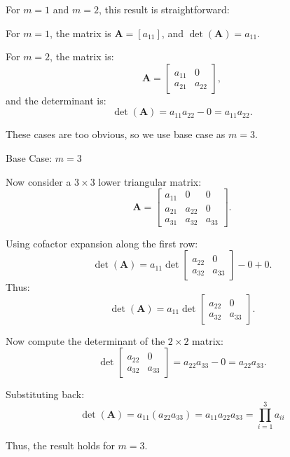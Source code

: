 \documentclass[12pt]{article}
\begin{document}
    For \( m = 1 \) and \( m = 2 \), this result is straightforward:
    
    For \( m = 1 \), the matrix is \( \mathbf{A} = [a_{11}] \), and \( \det(\mathbf{A}) = a_{11} \).
    
    For \( m = 2 \), the matrix is:
    \[
    \mathbf{A} = 
    \begin{bmatrix}
    a_{11} & 0 \\
    a_{21} & a_{22}
    \end{bmatrix},
    \]
    and the determinant is:
    \[
    \det(\mathbf{A}) = a_{11} a_{22} - 0 = a_{11} a_{22}.
    \]
        
    These cases are too obvious, so we use base case as $m=3$.
    \vspace{\baselineskip}

    Base Case: \( m = 3 \)
    
    Now consider a \( 3 \times 3 \) lower triangular matrix:
    \[
    \mathbf{A} = 
    \begin{bmatrix}
    a_{11} & 0 & 0 \\
    a_{21} & a_{22} & 0 \\
    a_{31} & a_{32} & a_{33}
    \end{bmatrix}.
    \]
    
    Using cofactor expansion along the first row:
    \[
    \det(\mathbf{A}) = a_{11} \det
    \begin{bmatrix}
    a_{22} & 0 \\
    a_{32} & a_{33}
    \end{bmatrix} - 0 + 0.
    \]
    Thus:
    \[
    \det(\mathbf{A}) = a_{11} \det
    \begin{bmatrix}
    a_{22} & 0 \\
    a_{32} & a_{33}
    \end{bmatrix}.
    \]
    
    Now compute the determinant of the \( 2 \times 2 \) matrix:
    \[
    \det
    \begin{bmatrix}
    a_{22} & 0 \\
    a_{32} & a_{33}
    \end{bmatrix}
    = a_{22} a_{33} - 0 = a_{22} a_{33}.
    \]
    
    
    Substituting back:
    \[
    \det(\mathbf{A}) = a_{11} (a_{22} a_{33}) = a_{11} a_{22} a_{33} =  \prod_{i=1}^3 a_{ii}
    \]
    
    Thus, the result holds for \( m = 3 \).
    \vspace{\baselineskip}
\end{document}
